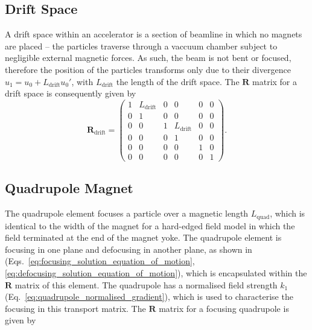 \documentclass[../main.tex]{subfiles}
\begin{document}
\subsection{Drift Space}

A drift space within an accelerator is a section of beamline in which no magnets are placed -- the particles traverse through a vaccuum chamber subject to negligible external magnetic forces. As such, the beam is not bent or focused, therefore the position of the particles transforms only due to their divergence $u_{1} = u_{0} + L_{\mathrm{drift}}u_{0}'$, with $L_{\mathrm{drift}}$ the length of the drift space. The $\boldsymbol{R}$ matrix for a drift space is consequently given by  
\begin{equation}
\boldsymbol{R}_{\mathrm{drift}} =
\begin{pmatrix}
1 & L_{\mathrm{drift}} & 0 & 0 & 0 & 0 \\
0 & 1 & 0 & 0 & 0 & 0 \\
0 & 0 & 1 & L_{\mathrm{drift}} & 0 & 0 \\
0 & 0 & 0 & 1 & 0 & 0 \\
0 & 0 & 0 & 0 & 1 & 0 \\
0 & 0 & 0 & 0 & 0 & 1
\end{pmatrix}.
\label{eq:drift_matrix}    
\end{equation}

\subsection{Quadrupole Magnet}

The quadrupole element focuses a particle over a magnetic length $L_{\mathrm{quad}}$, which is identical to the width of the magnet for a hard-edged field model in which the field terminated at the end of the magnet yoke. The quadrupole element is focusing in one plane and defocusing in another plane, as shown in (Eqs.~\ref{eq:focusing_solution_equation_of_motion}, \ref{eq:defocusing_solution_equation_of_motion}), which is encapsulated within the $\boldsymbol{R}$ matrix of this element. The quadrupole has a normalised field strength $k_{1}$ (Eq.~\ref{eq:quadrupole_normalised_gradient}), which is used to characterise the focusing in this transport matrix. The $\boldsymbol{R}$ matrix for a focusing quadrupole is given by
\end{document}
